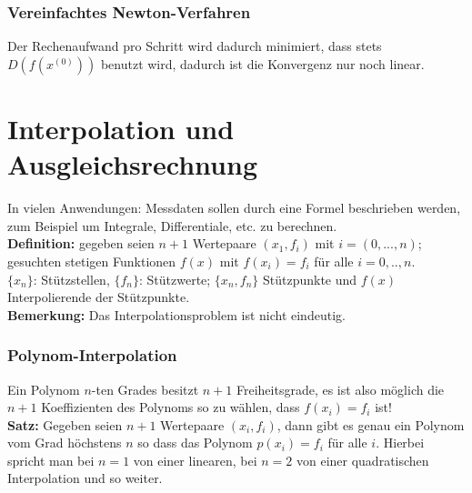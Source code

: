 \documentclass{scrartcl}
\begin{document}
\subsubsection*{Vereinfachtes Newton-Verfahren}
Der Rechenaufwand pro Schritt wird dadurch minimiert, dass stets $D(f(x^{(0)}))$ benutzt wird, dadurch ist die Konvergenz nur noch linear.

\section{Interpolation und Ausgleichsrechnung}
In vielen Anwendungen: Messdaten sollen durch eine Formel beschrieben werden, zum Beispiel um Integrale, Differentiale, etc. zu berechnen.\\
\textbf{Definition:} gegeben seien $n+1$ Wertepaare $(x_1, f_i)$ mit $i=(0,...,n)$; gesuchten stetigen Funktionen $f(x)$ mit $f(x_i)=f_i$ für alle $i=0,..,n$.\\
$\{x_n\}$: Stützstellen, $\{f_n\}$: Stützwerte; $\{x_n, f_n\}$ Stützpunkte und $f(x)$ Interpolierende der Stützpunkte.\\
\textbf{Bemerkung:} Das Interpolationsproblem ist nicht eindeutig.

\subsubsection{Polynom-Interpolation}
Ein Polynom $n$-ten Grades besitzt $n+1$ Freiheitsgrade, es ist also möglich die $n+1$ Koeffizienten des Polynoms so zu wählen, dass $f(x_i)=f_i$ ist!\\
\textbf{Satz:} Gegeben seien $n+1$ Wertepaare $(x_i,f_i)$, dann gibt es genau ein Polynom vom Grad höchstens $n$ so dass das Polynom $p(x_i)=f_i$ für alle $i$.
Hierbei spricht man bei $n=1$ von einer linearen, bei $n=2$ von einer quadratischen Interpolation und so weiter.\\
\end{document}
